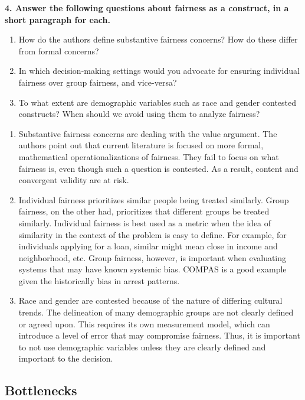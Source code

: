\documentclass{article}
\begin{document}
\textbf{4. Answer the following questions about fairness as a construct, in a short paragraph for each.}
\begin{enumerate}[label=\Alph*.]
\item How do the authors define substantive fairness concerns? How do these differ from formal concerns? 
\item In which decision-making settings would you advocate for ensuring individual fairness over group fairness, and vice-versa?
\item To what extent are demographic variables such as race and gender contested constructs? When should we avoid using them to analyze fairness?
\end{enumerate}

\bigskip
\begin{mdframed}
\begin{enumerate}[label=\Alph*.]
\item Substantive fairness concerns are dealing with the value argument. The authors point out that current literature is focused on more formal, mathematical operationalizations of fairness. They fail to focus on what fairness is, even though such a question is contested. As a result, content and convergent validity are at risk.
\item Individual fairness prioritizes similar people being treated similarly. Group fairness, on the other had, prioritizes that different groups be treated similarly. Individual fairness is best used as a metric when the idea of similarity in the context of the problem is easy to define. For example, for individuals applying for a loan, similar might mean close in income and neighborhood, etc. Group fairness, however, is important when evaluating systems that may have known systemic bias. COMPAS is a good example given the historically bias in arrest patterns.
\item Race and gender are contested because of the nature of differing cultural trends. The delineation of many demographic groups are not clearly defined or agreed upon. This requires its own measurement model, which can introduce a level of error that may compromise fairness. Thus, it is important to not use demographic variables unless they are clearly defined and important to the decision.  
\end{enumerate}
\end{mdframed}
\bigskip


\subsection*{Bottlenecks}
\end{document}
